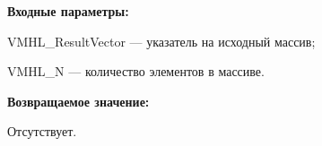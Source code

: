 \textbf{Входные параметры:}
 
VMHL\_ResultVector --- указатель на исходный массив;
 
VMHL\_N --- количество элементов в массиве.

\textbf{Возвращаемое значение:}

Отсутствует.
